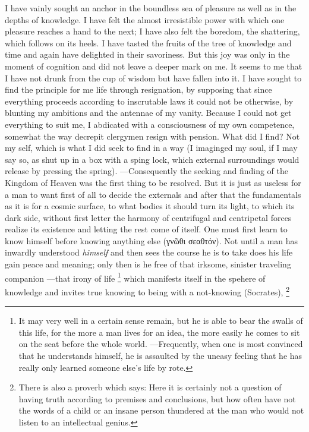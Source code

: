 I have vainly sought an anchor in the boundless sea of
  pleasure as well as in the depths of knowledge.
I have felt the almost irresistible power with which one
  pleasure reaches a hand to the next; I have also felt the
  boredom, the shattering, which follows on its heels.
I have tasted the fruits of the tree of knowledge and time
  and again have delighted in their savoriness.
But this joy was only in the moment of cognition and did not
  leave a deeper mark on me.
It seems to me that I have not drunk from the cup of wisdom
  but have fallen into it.
I have sought to find the principle for me life through
  resignation, by supposing that since everything proceeds according
  to inscrutable laws it could not be otherwise, by blunting my
  ambitions and the antennae of my vanity.
Because I could not get everything to suit me, I abdicated
  with a consciousness of my own competence, somewhat the way
  decrepit clergymen resign with pension.
What did I find?
Not my self, which is what I did seek to find in a way (I
  imaginged my soul, if I may say so, as shut up in a box with
  a sping lock, which external surroundings would release by
  pressing the spring).
---Consequently the seeking and finding of the Kingdom of Heaven
  was the first thing to be resolved.
But it is just as useless for a man to want first of all to
  decide the externals and after that the fundamentals as it is
  for a cosmic surface, to what bodies it should turn its light,
  to which its dark side, without first letter the harmony of
  centrifugal and centripetal forces realize its existence and
  letting the rest come of itself.
One must first learn to know himself before knowing anything
  else  (γνῶθι σεαθτόν). 
Not until a man has inwardly understood \textit{himself} and
  then sees the course he is to take does his life gain peace
  and meaning; only then is he free of that irksome, sinister
  traveling companion ---that irony of life
  \footnote{
  It may very well in a certain sense remain, but he is able
      to bear the swalls of this life, for the more a man lives
      for an idea, the more easily he comes to sit on the  seat before the whole world.
  ---Frequently, when one is most convinced that he understands
      himself, he is assaulted by the uneasy feeling that he has
      really only learned someone else's life by rote.
  }
  which manifests itself in the spehere of knowledge and invites
  true knowing to being with a not-knowing (Socrates),
  \footnote{
  There is also a proverb which says: 
  Here it is certainly not a question of having truth according
      to premises and conclusions, but how often have not the words
      of a child or an insane person thundered at the man who
      would not listen to an intellectual genius.
  }
